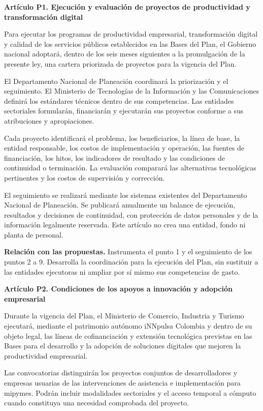 \textbf{Artículo P1. Ejecución y evaluación de proyectos de productividad y transformación digital}\par\nobreak

Para ejecutar los programas de productividad empresarial, transformación digital y calidad de los servicios públicos establecidos en las Bases del Plan, el Gobierno nacional adoptará, dentro de los seis meses siguientes a la promulgación de la presente ley, una cartera priorizada de proyectos para la vigencia del Plan.

El Departamento Nacional de Planeación coordinará la priorización y el seguimiento. El Ministerio de Tecnologías de la Información y las Comunicaciones definirá los estándares técnicos dentro de sus competencias. Las entidades sectoriales formularán, financiarán y ejecutarán sus proyectos conforme a sus atribuciones y apropiaciones.

Cada proyecto identificará el problema, los beneficiarios, la línea de base, la entidad responsable, los costos de implementación y operación, las fuentes de financiación, los hitos, los indicadores de resultado y las condiciones de continuidad o terminación. La evaluación comparará las alternativas tecnológicas pertinentes y los costos de supervisión y corrección.

El seguimiento se realizará mediante los sistemas existentes del Departamento Nacional de Planeación. Se publicará anualmente un balance de ejecución, resultados y decisiones de continuidad, con protección de datos personales y de la información legalmente reservada. Este artículo no crea una entidad, fondo ni planta de personal.

\textbf{Relación con las propuestas.} Instrumenta el punto 1 y el seguimiento de los puntos 2 a 9. Desarrolla la coordinación para la ejecución del Plan, sin sustituir a las entidades ejecutoras ni ampliar por sí mismo sus competencias de gasto.

\textbf{Artículo P2. Condiciones de los apoyos a innovación y adopción empresarial}\par\nobreak

Durante la vigencia del Plan, el Ministerio de Comercio, Industria y Turismo ejecutará, mediante el patrimonio autónomo iNNpulsa Colombia y dentro de su objeto legal, las líneas de cofinanciación y extensión tecnológica previstas en las Bases para el desarrollo y la adopción de soluciones digitales que mejoren la productividad empresarial.

Las convocatorias distinguirán los proyectos conjuntos de desarrolladores y empresas usuarias de las intervenciones de asistencia e implementación para mipymes. Podrán incluir modalidades sectoriales y el acceso temporal a cómputo cuando constituya una necesidad comprobada del proyecto.

